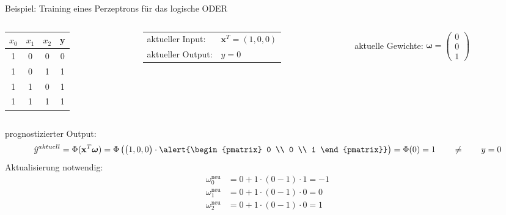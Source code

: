 \documentclass[11pt, aspectratio=169, t]{beamer}
\begin{document}
\begin{frame}{Beispiel: Training eines Perzeptrons für das logische ODER}
\begin{small}
\begin{columns}
\begin{column}{0.25\textwidth}
\hspace{0.5cm}
\begin{footnotesize}
\begin{tabular}{cccc} \toprule
$x_0$ & $x_1$ & $x_2$ & y \\ \midrule
1 & 0 & 0 & 0 \\
1 & 0 & 1 & 1 \\
1 & 1 & 0 & 1 \\
1 & 1 & 1 & 1 \\ \bottomrule
\end{tabular} \end{footnotesize}
\end{column}
\begin{column}{0.4\textwidth}
\begin{tabular}{ll}
aktueller Input: & $\mathbf{x}^{T} = (1, 0, 0)$ \\
aktueller Output: & $y=0$ \\
\end{tabular}
\end{column}
\begin{column}{0.4\textwidth}
aktuelle Gewichte: \alert{ $\boldsymbol{\omega} = \begin{pmatrix} 0 \\ 0 \\ 1 \end{pmatrix}$ }
\end{column}
\end{columns}
prognostizierter Output:
\[\hat{y}^{aktuell} = \Phi(\mathbf{x}^{T}\boldsymbol{\omega}) = \Phi\left( \begin{pmatrix} 1, 0, 0 \end{pmatrix}\cdot \alert{\begin{pmatrix} 0 \\ 0 \\ 1 \end{pmatrix}} \right) = \Phi(0) = 1 \qquad \neq \qquad y = 0\]
Aktualisierung notwendig:
\begin{align*}
\omega_0^{\text{neu}} &=  0 + 1\cdot (0-1)\cdot 1 = -1 \\
\omega_1^{\text{neu}} &=  0 + 1\cdot (0-1)\cdot 0 = 0 \\
\omega_2^{\text{neu}} &=  0 + 1\cdot (0-1)\cdot 0 = 1
\end{align*}
\end{small}
\end{frame}
\end{document}
